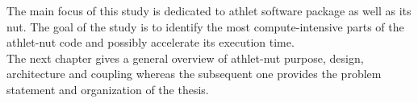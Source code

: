 The main focus of this study is dedicated to \acrfull{athlet} software package as well as its \acrfull{nut}. The goal of the study is to identify the most compute-intensive parts of the \acrshort{athlet}-\acrshort{nut} code and possibly accelerate its execution time.\\


The next chapter gives a general overview of \acrshort{athlet}-\acrshort{nut} purpose, design, architecture and coupling whereas the subsequent one provides the problem statement and organization of the thesis.\\

